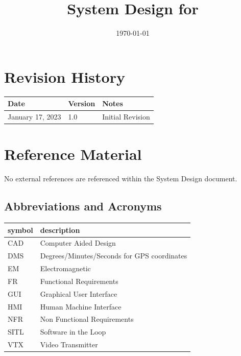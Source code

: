 \documentclass[12pt, titlepage]{article}
\begin{document}
\title{System Design for \progname{}} 
\author{\authname}
\date{\today}

\maketitle


\section{Revision History}

\begin{tabularx}{\textwidth}{p{3cm}p{2cm}X}
\toprule {\bf Date} & {\bf Version} & {\bf Notes}\\
\midrule
January 17, 2023 & 1.0 & Initial Revision\\
\bottomrule
\end{tabularx}

\newpage

\section{Reference Material}

No external references are referenced within the System Design document.

\subsection{Abbreviations and Acronyms}

\renewcommand{\arraystretch}{1.2}
\begin{tabular}{l l} 
  \toprule		
  \textbf{symbol} & \textbf{description}\\
  \midrule 
  CAD & Computer Aided Design \\
  DMS & Degrees/Minutes/Seconds for GPS coordinates \\
  EM & Electromagnetic \\
  FR & Functional Requirements \\
  GUI & Graphical User Interface \\
  HMI & Human Machine Interface \\
  NFR & Non Functional Requirements \\
  SITL & Software in the Loop \\
  VTX & Video Transmitter \\
  \bottomrule
\end{tabular}\\
\end{document}
